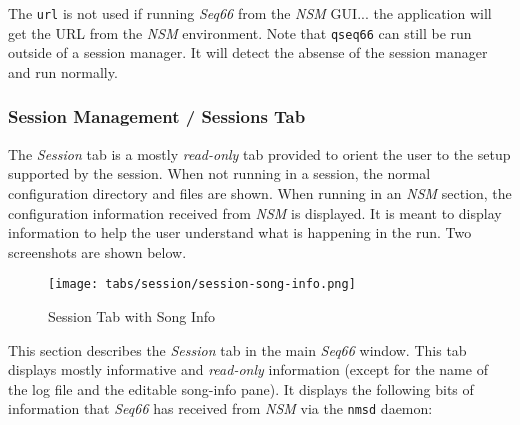    The \texttt{url} is not used if running \textsl{Seq66} from the \textsl{NSM}
   GUI... the application will get the URL from the \textsl{NSM} environment.
   Note that \texttt{qseq66} can still be run outside of a
   session manager.  It will detect the absense of the session manager and run
   normally.

\subsubsection{Session Management / Sessions Tab}
\label{subsubsec:sessions_tab}

   The \textsl{Session} tab is a mostly \textsl{read-only} tab
   provided to orient the user to the setup supported by the session.
   When not running in a session, the normal configuration directory and files
   are shown.  When running in an \textsl{NSM} section, the configuration
   information received from \textsl{NSM} is displayed.
   It is meant to display information to
   help the user understand what is happening in the run.
   Two screenshots are shown below.

\begin{figure}[H]
   \centering 
   \texttt{[image: tabs/session/session-song-info.png]}
   \caption*{Session Tab with Song Info}
\end{figure}

   This section describes the \textsl{Session} tab in the main
   \textsl{Seq66} window.  This tab displays mostly informative and
   \textsl{read-only} information (except for the name of the log file
   and the editable song-info pane).
   It displays the following bits of information that \textsl{Seq66} has
   received from \textsl{NSM} via the \texttt{nmsd} daemon:

